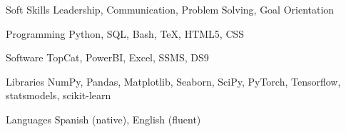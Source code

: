 
\begin{cvskills}

        \cvskill
        {Soft Skills}
    {Leadership, Communication, Problem Solving, Goal Orientation}

	\cvskill
	{Programming}
    {Python, SQL, Bash, \TeX, HTML5, CSS}

        \cvskill
        {Software}
    {TopCat, PowerBI, Excel, SSMS, DS9}

	\cvskill
	{Libraries}
    {NumPy, Pandas, Matplotlib, Seaborn, SciPy, PyTorch, Tensorflow, statsmodels, scikit-learn}

        \cvskill
        {Languages}
    {Spanish (native), English (fluent)}
\end{cvskills}
